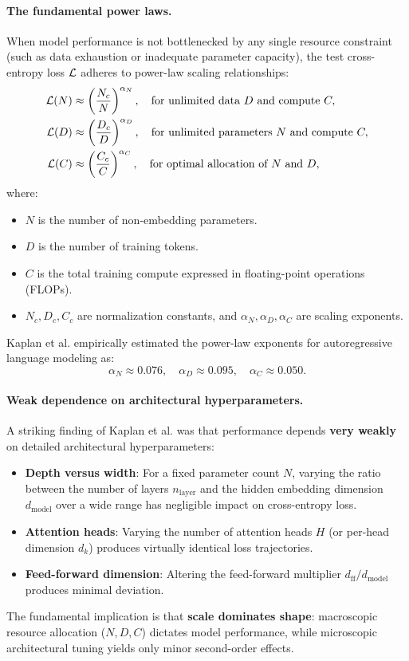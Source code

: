 \documentclass[../../main.tex]{subfiles}
\begin{document}
\paragraph{The fundamental power laws.}
When model performance is not bottlenecked by any single resource constraint (such as data exhaustion or inadequate parameter capacity), the test cross-entropy loss $\mathcal{L}$ adheres to power-law scaling relationships:
\begin{align}
\label{eq:kaplan_param_scaling}
\mathcal{L}(N) &\approx \left( \frac{N_c}{N} \right)^{\alpha_N}, \quad \text{for unlimited data } D \text{ and compute } C, \\
\label{eq:kaplan_data_scaling}
\mathcal{L}(D) &\approx \left( \frac{D_c}{D} \right)^{\alpha_D}, \quad \text{for unlimited parameters } N \text{ and compute } C, \\
\label{eq:kaplan_compute_scaling}
\mathcal{L}(C) &\approx \left( \frac{C_c}{C} \right)^{\alpha_C}, \quad \text{for optimal allocation of } N \text{ and } D,
\end{align}
where:
\begin{itemize}
    \item $N$ is the number of non-embedding parameters.
    \item $D$ is the number of training tokens.
    \item $C$ is the total training compute expressed in floating-point operations (FLOPs).
    \item $N_c, D_c, C_c$ are normalization constants, and $\alpha_N, \alpha_D, \alpha_C$ are scaling exponents.
\end{itemize}
Kaplan et al. empirically estimated the power-law exponents for autoregressive language modeling as:
\begin{equation}
\alpha_N \approx 0.076, \quad \alpha_D \approx 0.095, \quad \alpha_C \approx 0.050.
\end{equation}

\paragraph{Weak dependence on architectural hyperparameters.}
A striking finding of Kaplan et al. was that performance depends \textbf{very weakly} on detailed architectural hyperparameters:
\begin{itemize}
    \item \textbf{Depth versus width}: For a fixed parameter count $N$, varying the ratio between the number of layers $n_{\text{layer}}$ and the hidden embedding dimension $d_{\text{model}}$ over a wide range has negligible impact on cross-entropy loss.
    \item \textbf{Attention heads}: Varying the number of attention heads $H$ (or per-head dimension $d_k$) produces virtually identical loss trajectories.
    \item \textbf{Feed-forward dimension}: Altering the feed-forward multiplier $d_{\text{ff}} / d_{\text{model}}$ produces minimal deviation.
\end{itemize}
The fundamental implication is that \textbf{scale dominates shape}: macroscopic resource allocation ($N, D, C$) dictates model performance, while microscopic architectural tuning yields only minor second-order effects.
\end{document}
